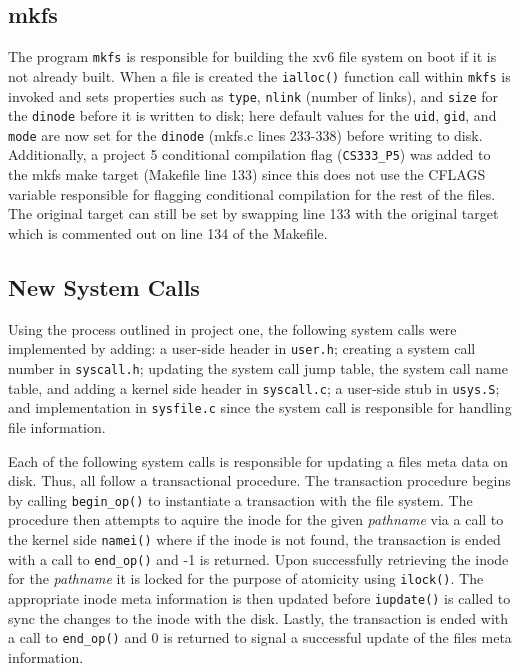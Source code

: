 \documentclass[11pt,letterpaper]{report}
\begin{document}
	\subsection*{mkfs}
	The program {\tt mkfs} is responsible for building the xv6 file system on boot if it is not already built. When a file is created the {\tt ialloc()} function call within {\tt mkfs} is invoked and sets properties
	such as {\tt type}, {\tt nlink} (number of links), and {\tt size} for the {\tt dinode} before it is written to disk; here default values for the {\tt uid}, {\tt gid}, and {\tt mode} are now set for the
	 {\tt dinode} (mkfs.c lines 233-338) before writing to disk. Additionally, a project 5 conditional compilation flag ({\tt CS333\_P5}) was added to the mkfs make target (Makefile line 133) since this does not use 
	 the CFLAGS variable responsible for flagging conditional compilation for the rest of the files. The original target can still be set by swapping line 133 with the original target which is commented out 
	 on line 134 of the Makefile. 
	
	
	\subsection*{New System Calls}
	Using the process outlined in project one, the following system calls were implemented by adding: a user-side header in {\tt user.h}; 
	creating a system call number in {\tt syscall.h}; updating the system call jump table, the system call name table, and adding a kernel side
	header in {\tt syscall.c}; 
	a user-side stub in {\tt usys.S}; and implementation in {\tt sysfile.c} since the system call is responsible for handling file information. 
	
	Each of the following system calls is responsible for updating a files meta data on disk. Thus, all follow a transactional procedure. The transaction procedure begins by
	 calling {\tt begin\_op()} to instantiate a transaction with the
	file system. The procedure then attempts to aquire the inode for the given \emph{pathname} via a call to the kernel side {\tt namei()} where if the inode is not found, the transaction is ended with a call to {\tt end\_op()} and -1
	is returned. Upon successfully retrieving the inode for the \emph{pathname} it is locked for the purpose of atomicity using {\tt ilock()}. The appropriate inode meta information is then updated before  
	{\tt iupdate()} is called to sync the changes to the inode with the disk. Lastly, the transaction is ended with a call to {\tt end\_op()} and 0 is returned to signal a successful update of the files meta information.
\end{document}
